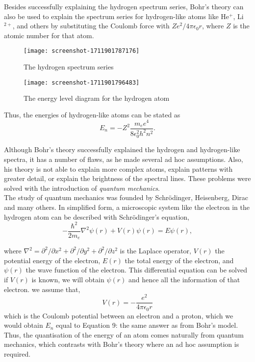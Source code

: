 \documentclass[a4paper,11pt]{article}
\begin{document}
Besides successfully explaining the hydrogen spectrum series, Bohr's theory can also be used to explain the spectrum series for hydrogen-like atoms like He$^+$, Li$^{2+}$, and others by substituting the Coulomb force with $Ze^2 / 4\pi\epsilon_0 r$, where $Z$ is the atomic number for that atom.
\newpage
\begin{figure}[h!]
\centering
\texttt{[image: screenshot-1711901787176]}
\caption{The hydrogen spectrum series}
\label{10}
\end{figure}
\begin{figure}[h!]
\centering
\texttt{[image: screenshot-1711901796483]}
\caption{The energy level diagram for the hydrogen atom}
\label{9}
\end{figure}
Thus, the energies of hydrogen-like atoms can be stated as
\begin{equation}
E_n = -Z^2 \frac{m_e e^4}{8\epsilon_0^2 h^2 n^2}.
\end{equation}

Although Bohr's theory successfully explained the hydrogen and hydrogen-like spectra, it has a number of flaws, as he made several ad hoc assumptions. Also, his theory is not able to explain more complex atoms, explain patterns with greater detail, or explain the brightness of the spectral lines. These problems were solved with the introduction of \textit{quantum mechanics}.\\

The study of quantum mechanics was founded by Schrödinger, Heisenberg, Dirac and many others. In simplified form, a microscopic system like the electron in the hydrogen atom can be described with Schrödinger's equation,
\begin{equation}
- \frac{\hbar^2}{2m_e} \nabla^2 \psi(r) + V(r) \psi(r) = E \psi(r),
\end{equation}

where $\nabla^2 = \partial^2 / \partial x^2 + \partial^2 / \partial y^2 + \partial^2 / \partial z^2$ is the Laplace operator, $V(r)$ the potential energy of the electron, $E(r)$ the total energy of the electron, and $\psi(r)$ the wave function of the electron. This differential equation can be solved if $V(r)$ is known, we will obtain $\psi(r)$ and hence all the information of that electron.
\newpage
we assume that,
\begin{equation}
V(r) = - \frac{e^2}{4\pi\epsilon_0 r}
\end{equation}
which is the Coulomb potential between an electron and a proton, which we would obtain $E_n$ equal to Equation 9: the same answer as from Bohr's model. Thus, the quantisation of the energy of an atom comes naturally from quantum mechanics, which contrasts with Bohr's theory where an ad hoc assumption is required.
\end{document}
